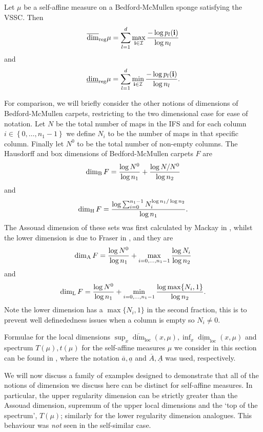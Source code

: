 \newpage
\begin{theorem}\label{ch-upper-reg:carpet}
	Let $\mu$ be a self-affine measure on a Bedford-McMullen sponge satisfying the VSSC.  Then
	\[
	\overline{\dim}_{\textup{reg}} \mu =\sum_{l=1}^d \max_{\mathbf{i}\in \mathcal{I}}\frac{-\log p_l(\mathbf{i})}{\log n_l}
	\]
	and 
	\[
	\underline{\dim}_{\textup{reg}} \mu =\sum_{l=1}^d \min_{\mathbf{i}\in \mathcal{I}}\frac{-\log p_l(\mathbf{i})}{\log n_l}.
	\]
\end{theorem}

For comparison, we will briefly consider the other notions of dimensions of Bedford-McMullen carpets, restricting to the two dimensional case for ease of notation. Let $N$ be the total number of maps in the IFS and for each column $i\in \left\{0,\ldots, n_1 - 1\right\}$ we define $N_i$ to be the number of maps in that specific column. Finally let $N^0$ to be the total number of non-empty columns. The Hausdorff and box dimensions of Bedford-McMullen carpets $F$ are 
\[
\dim_{\textup{B}} F = \frac{\log N^0}{\log n_1} + \frac{\log N/N^0}{\log n_2}
\]
and 
\[
\dim_{\textup{H}} F = \frac{\log \sum_{i=0}^{n_1 - 1} N_i^{\log n_1 / \log n_2} }{\log n_1}.
\]
The Assouad dimension of these sets was first calculated by Mackay in \cite{mackay}, whilst the lower dimension is due to Fraser in \cite{Fr}, and they are
\[
\dim_{\textup{A}} F = \frac{\log N^0}{\log n_1} + \max_{i = 0, \ldots, n_1-1} \frac{\log N_i}{\log n_2}
\]
and 
\[
\dim_{\textup{L}} F = \frac{\log N^0}{\log n_1} + \min_{i = 0, \ldots, n_1-1} \frac{\log \max\{N_i, 1 \}}{\log n_2}.
\]
Note the lower dimension has a $\max\{N_i, 1\}$ in the second fraction, this is to prevent well definededness issues when a column is empty so $N_i \neq 0$.


Formulae for the local dimensions $\sup_x \overline{\dim}_{\text{loc}}(x,\mu), \inf_x \underline{\dim}_{\text{loc}}(x,\mu)$ and spectrum $T(\mu), t(\mu)$ for the self-affine measures $\mu$ we consider in this section can be found in \cite{sponges}, where the notation $\overline{a}, \underline{a}$ and $\overline{A}, \underline{A}$ was used, respectively.


We will now discuss a family of examples designed to demonstrate that all of the notions of dimension we discuss here can be distinct for self-affine measures.  In particular, the upper regularity dimension can be strictly greater than the Assouad dimension, supremum of the upper local dimensions and the `top of the spectrum', $T(\mu)$; similarly for the lower regularity dimension analogues.  This behaviour was \emph{not} seen in the self-similar case.

